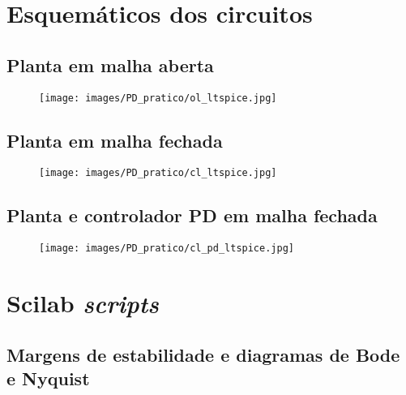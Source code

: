 \appendix
\section{Esquemáticos dos circuitos}

\subsection{Planta em malha aberta}

\begin{figure}[H]\label{ltspice:ol} 
\begin{center}
    \texttt{[image: images/PD\_pratico/ol\_ltspice.jpg]}  
\end{center}
\end{figure}

\subsection{Planta em malha fechada}

\begin{figure}[H]\label{ltspice:cl} 
\begin{center}
    \texttt{[image: images/PD\_pratico/cl\_ltspice.jpg]} 
\end{center}

\end{figure}

\subsection{Planta e controlador PD em malha fechada}

\begin{figure}[H]\label{ltspice:clpd} 
\begin{center}
    \texttt{[image: images/PD\_pratico/cl\_pd\_ltspice.jpg]}  
\end{center}
\end{figure}

\pagebreak

\section{Scilab \textit{scripts}}

\subsection{Margens de estabilidade e diagramas de Bode e Nyquist}

